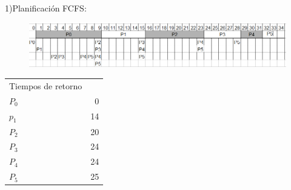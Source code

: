 \documentclass[twoside, a4paper]{article}
\begin{document}
1)Planificaci\'on FCFS:\\
\begin{figure}[!htb]
\includegraphics[scale=0.60]{FCFS.PNG}
\end{figure}
\begin{tabular}{l r}
Tiempos de retorno&\\
$P_0$ & 0 \\
$p_1$ & 14 \\
$P_2$ & 20 \\
$P_3$ & 24 \\
$P_4$ & 24 \\
$P_5$ & 25
\end{tabular}
\end{document}

